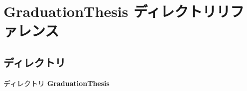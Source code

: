 \section{Graduation\-Thesis ディレクトリリファレンス}
\label{dir_8a88acfa4170d9a359748aee931fa59d}
\subsection*{ディレクトリ}
\begin{DoxyCompactItemize}
\item 
ディレクトリ {\bf Graduation\-Thesis}
\end{DoxyCompactItemize}
